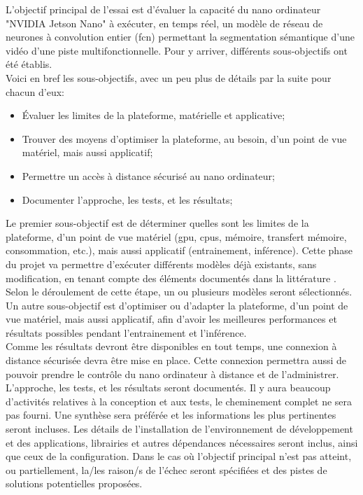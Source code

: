 ﻿\noindent L'objectif principal de l'essai est d'évaluer la capacité du nano ordinateur "NVIDIA Jetson Nano" à exécuter, en temps réel, un modèle de réseau de neurones à convolution entier (\acrshort{fcn}) permettant la segmentation sémantique d'une vidéo d'une piste multifonctionnelle. Pour y arriver, différents sous-objectifs ont été établis. 
\vspace{\baselineskip}
\\
\noindent Voici en bref les sous-objectifs, avec un peu plus de détails par la suite pour chacun d'eux: 
\begin{itemize}
   \item Évaluer les limites de la plateforme, matérielle et applicative; 
   \item Trouver des moyens d'optimiser la plateforme, au besoin, d'un point de vue matériel, mais aussi applicatif; 
   \item Permettre un accès à distance sécurisé au nano ordinateur;
   \item Documenter l'approche, les tests, et les résultats;
\end{itemize}
\vspace{\baselineskip}
\noindent Le premier sous-objectif est de déterminer quelles sont les limites de la plateforme, d'un point de vue matériel (\acrshort{gpu}, \acrshort{cpu}s, mémoire, transfert mémoire, consommation, etc.), mais aussi applicatif (entrainement, inférence). Cette phase du projet va permettre d'exécuter différents modèles déjà existants, sans  modification, en tenant compte des éléments documentés dans la littérature \parencite{nguyen_mavnet_2019} \parencite{zheng_real-time_2020} \parencite{nvidia_jetson_2019-1}. Selon le déroulement de cette étape, un ou plusieurs modèles seront sélectionnés. 
\vspace{\baselineskip}
\\
\noindent Un autre sous-objectif est d'optimiser ou d'adapter la plateforme, d'un point de vue matériel, mais aussi applicatif, afin d'avoir les meilleures performances et résultats possibles pendant l'entrainement et l'inférence.
\vspace{\baselineskip}
\\
\noindent Comme les résultats devront être disponibles en tout temps, une connexion à distance sécurisée devra être mise en place. Cette connexion permettra aussi de pouvoir prendre le contrôle du nano ordinateur à distance et de l'administrer.
\vspace{\baselineskip}
\\
\noindent L'approche, les tests, et les résultats seront documentés. Il y aura beaucoup d'activités relatives à la conception et aux tests, le cheminement complet ne sera pas fourni. Une synthèse sera préférée et les informations les plus pertinentes seront incluses. Les détails de l'installation de l'environnement de développement et des applications, librairies et autres dépendances nécessaires seront inclus, ainsi que ceux de la configuration. Dans le cas où l'objectif principal n'est pas atteint, ou partiellement, la/les raison/s de l'échec seront spécifiées et des pistes de solutions potentielles proposées.